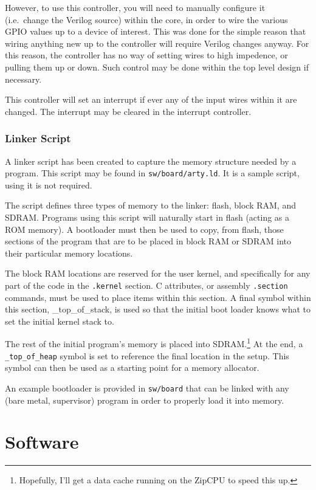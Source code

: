 \documentclass{gqtekspec}
\begin{document}
However, to use this controller, you will need to manually configure it
(i.e.~change the Verilog source) within the core, in order to wire the various
GPIO values up to a device of interest.  This was done for the simple reason
that wiring anything new up to the controller will require Verilog changes
anyway.  For this reason, the controller has no way of setting wires to high
impedence, or pulling them up or down.  Such control may be done within the
top level design if necessary.

This controller will set an interrupt if ever any of the input wires within
it are changed.  The interrupt may be cleared in the interrupt controller.

\subsection{Linker Script}

A linker script has been created to capture the memory structure needed by
a program.  This script may be found in {\tt sw/board/arty.ld}.  It is a
sample script, using it is not required.

The script defines three types of memory to the linker: flash, block RAM, and
SDRAM.  Programs using this script will naturally start in flash (acting as
a ROM memory).  A bootloader must then be used to copy, from flash, those
sections of the program that are to be placed in block RAM or SDRAM into
their particular memory locations.

The block RAM locations are reserved for the user kernel, and specifically for
any part of the code in the {\tt .kernel} section.  C attributes, or assembly
{\tt .section} commands, must be used to place items within this section.
A final symbol within this section, {\_top\_of\_stack}, is used so that the
initial boot loader knows what to set the initial kernel stack to.

The rest of the initial program's memory is placed into
SDRAM.\footnote{Hopefully,
I'll get a data cache running on the ZipCPU to speed this up.}  At the end,
a {\tt \_top\_of\_heap} symbol is set to reference the final location in the
setup.  This symbol can then be used as a starting point for a memory allocator.

An example bootloader is provided in {\tt sw/board} that can be linked with
any (bare metal, supervisor) program in order to properly load it into memory.

\chapter{Software}
\end{document}
